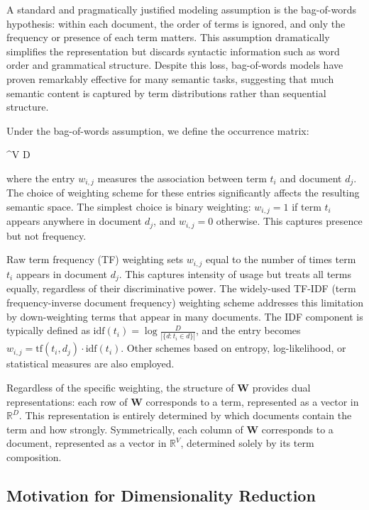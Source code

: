 A standard and pragmatically justified modeling assumption is the bag-of-words hypothesis: within each document, the order of terms is ignored, and only the frequency or presence of each term matters. This assumption dramatically simplifies the representation but discards syntactic information such as word order and grammatical structure. Despite this loss, bag-of-words models have proven remarkably effective for many semantic tasks, suggesting that much semantic content is captured by term distributions rather than sequential structure.

Under the bag-of-words assumption, we define the occurrence matrix:
\begin{myequation}
 \in {}^{V \times D}
\end{myequation}
where the entry $w_{i,j}$ measures the association between term $t_i$ and document $d_j$. The choice of weighting scheme for these entries significantly affects the resulting semantic space. The simplest choice is binary weighting: $w_{i,j} = 1$ if term $t_i$ appears anywhere in document $d_j$, and $w_{i,j} = 0$ otherwise. This captures presence but not frequency.

Raw term frequency (TF) weighting sets $w_{i,j}$ equal to the number of times term $t_i$ appears in document $d_j$. This captures intensity of usage but treats all terms equally, regardless of their discriminative power. The widely-used TF-IDF (term frequency-inverse document frequency) weighting scheme addresses this limitation by down-weighting terms that appear in many documents. The IDF component is typically defined as $\text{idf}(t_i) = \log \frac{D}{|\{d : t_i \in d\}|}$, and the entry becomes $w_{i,j} = \text{tf}(t_i, d_j) \cdot \text{idf}(t_i)$. Other schemes based on entropy, log-likelihood, or statistical measures are also employed.

Regardless of the specific weighting, the structure of $\mathbf{W}$ provides dual representations: each row of $\mathbf{W}$ corresponds to a term, represented as a vector in $\mathbb{R}^D$. This representation is entirely determined by which documents contain the term and how strongly. Symmetrically, each column of $\mathbf{W}$ corresponds to a document, represented as a vector in $\mathbb{R}^V$, determined solely by its term composition.

\subsection*{Motivation for Dimensionality Reduction}

